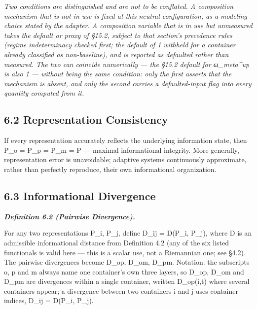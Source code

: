 \documentclass[
]{article}
\begin{document}
\emph{Two conditions are distinguished and are not to be conflated. A
composition mechanism that is not in use is fixed at this neutral
configuration, as a modeling choice stated by the adapter. A composition
variable that is in use but unmeasured takes the default or proxy of
§15.2, subject to that section's precedence rules (regime indeterminacy
checked first; the default of 1 withheld for a container already
classified as non-baseline), and is reported as defaulted rather than
measured. The two can coincide numerically --- the §15.2 default for
ω\_meta\^{}up is also 1 --- without being the same condition: only the
first asserts that the mechanism is absent, and only the second carries
a defaulted-input flag into every quantity computed from it.}

\hypertarget{representation-consistency}{%
\subsection{6.2 Representation
Consistency}\label{representation-consistency}}

If every representation accurately reflects the underlying information
state, then P\_o = P\_p = P\_m = P --- maximal informational integrity.
More generally, representation error is unavoidable; adaptive systems
continuously approximate, rather than perfectly reproduce, their own
informational organization.

\hypertarget{informational-divergence}{%
\subsection{6.3 Informational
Divergence}\label{informational-divergence}}

\emph{\textbf{Definition 6.2 (Pairwise Divergence).}}

For any two representations P\_i, P\_j, define D\_ij = D(P\_i, P\_j),
where D is an admissible informational distance from Definition 4.2 (any
of the six listed functionals is valid here --- this is a scalar use,
not a Riemannian one; see §4.2). The pairwise divergences become D\_op,
D\_om, D\_pm. Notation: the subscripts o, p and m always name one
container's own three layers, so D\_op, D\_om and D\_pm are divergences
within a single container, written D\_op(i,t) where several containers
appear; a divergence between two containers i and j uses container
indices, D\_ij = D(P\_i, P\_j).
\end{document}
